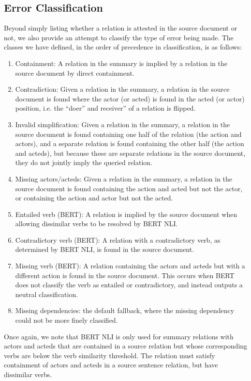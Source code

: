 \documentclass{article}
\begin{document}
\subsection{Error Classification}
\label{sec:classification-type}

Beyond simply listing whether a relation is attested in the source document or not, we also provide an attempt to classify the type of error being made. The classes we have defined, in the order of precedence in classification, is as follows:
\begin{enumerate}
    \item Containment: A relation in the summary is implied by a relation in the source document by direct containment.
    \item Contradiction: Given a relation in the summary, a relation in the source document is found where the actor (or acted) is found in the acted (or actor) position, i.e. the ``doer'' and receiver'' of a relation is flipped.
    \item Invalid simplification: Given a relation in the summary, a relation in the source document is found containing one half of the relation (the action and actors), and a separate relation is found containing the other half (the action and acteds), but because these are separate relations in the source document, they do not jointly imply the queried relation.
    \item Missing actors/acteds: Given a  relation in the summary, a relation in the source document is found containing the action and acted but not the actor, or containing the action and actor but not the acted.
    \item Entailed verb (BERT): A relation is implied by the source document when allowing dissimilar verbs to be resolved by BERT NLI.
    \item Contradictory verb (BERT): A relation with a contradictory verb, as determined by BERT NLI, is found in the source document.
    \item Missing verb (BERT): A relation containing the actors and acteds but with a different action is found in the source document. This occurs when BERT does not classify the verb as entailed or contradictory, and instead outputs a neutral classification.
    \item Missing dependencies: the default fallback, where the missing dependency could not be more finely classified.
\end{enumerate}

Once again, we note that BERT NLI is only used for summary relations with actors and acteds that are contained in a source relation but whose corresponding verbs are below the verb similarity threshold. The relation must satisfy containment of actors and acteds in a source sentence relation, but have dissimilar verbs.
\end{document}
